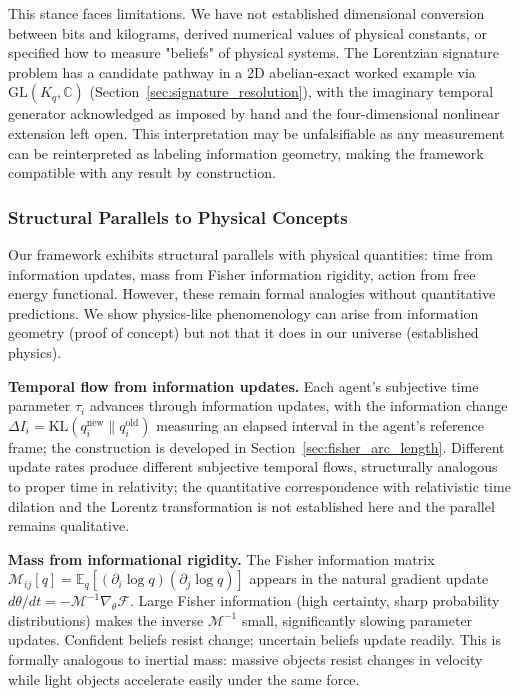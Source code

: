 \documentclass[11pt]{article}
\begin{document}
This stance faces limitations. We have not established dimensional conversion between bits and kilograms, derived numerical values of physical constants, or specified how to measure "beliefs" of physical systems. The Lorentzian signature problem has a candidate pathway in a 2D abelian-exact worked example via $\mathrm{GL}(K_q, \mathbb{C})$ (Section~\ref{sec:signature_resolution}), with the imaginary temporal generator acknowledged as imposed by hand and the four-dimensional nonlinear extension left open. This interpretation may be unfalsifiable as any measurement can be reinterpreted as labeling information geometry, making the framework compatible with any result by construction.

\subsubsection{Structural Parallels to Physical Concepts}

Our framework exhibits structural parallels with physical quantities: time from information updates, mass from Fisher information rigidity, action from free energy functional. However, these remain formal analogies without quantitative predictions. We show physics-like phenomenology can arise from information geometry (proof of concept) but not that it does in our universe (established physics).

\textbf{Temporal flow from information updates.} Each agent's subjective time parameter $\tau_i$ advances through information updates, with the information change $\Delta I_i = \mathrm{KL}(q_i^{\text{new}} \| q_i^{\text{old}})$ measuring an elapsed interval in the agent's reference frame; the construction is developed in Section~\ref{sec:fisher_arc_length}. Different update rates produce different subjective temporal flows, structurally analogous to proper time in relativity; the quantitative correspondence with relativistic time dilation and the Lorentz transformation is not established here and the parallel remains qualitative.

\textbf{Mass from informational rigidity.} The Fisher information matrix $\mathcal{M}_{ij}[q] = \mathbb{E}_{q}[(\partial_i \log q)(\partial_j \log q)]$ appears in the natural gradient update $d\theta/dt = -\mathcal{M}^{-1} \nabla_\theta \mathcal{F}$. Large Fisher information (high certainty, sharp probability distributions) makes the inverse $\mathcal{M}^{-1}$ small, significantly slowing parameter updates. Confident beliefs resist change; uncertain beliefs update readily. This is formally analogous to inertial mass: massive objects resist changes in velocity while light objects accelerate easily under the same force.
\end{document}
